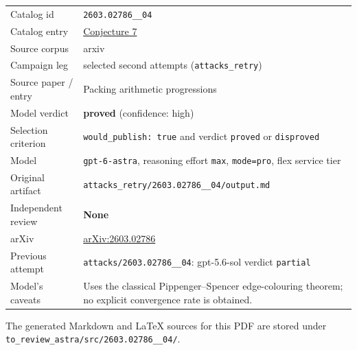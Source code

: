 \documentclass[
  11pt,
  a4paper,
]{article}
\newcounter{none} %
\begin{document}
{\def\LTcaptype{none} %
\begin{longtable}[]{@{}
  >{\raggedright\arraybackslash}p{}
  >{\raggedright\arraybackslash}p{}@{}}
\toprule\noalign{}
\endhead
\bottomrule\noalign{}
\endlastfoot
Catalog id & \texttt{2603.02786\_\_04} \\
Catalog entry &
\href{https://graph-theory-ai.github.io/graph-conjectures/arxiv/2603.02786__04/}{Conjecture
7} \\
Source corpus & arxiv \\
Campaign leg & selected second attempts (\texttt{attacks\_retry}) \\
Source paper / entry & Packing arithmetic progressions \\
Model verdict & \textbf{proved} (confidence: high) \\
Selection criterion & \texttt{would\_publish:\ true} and verdict
\texttt{proved} or \texttt{disproved} \\
Model & \texttt{gpt-6-astra}, reasoning effort \texttt{max},
\texttt{mode=pro}, flex service tier \\
Original artifact &
\texttt{attacks\_retry/2603.02786\_\_04/output.md} \\
Independent review & \textbf{None} \\
arXiv & \href{https://arxiv.org/abs/2603.02786}{arXiv:2603.02786} \\
Previous attempt & \texttt{attacks/2603.02786\_\_04}: gpt-5.6-sol
verdict \texttt{partial} \\
Model's caveats & Uses the classical Pippenger--Spencer edge-colouring
theorem; no explicit convergence rate is obtained. \\
\end{longtable}
}

The generated Markdown and LaTeX sources for this PDF are stored under
\texttt{to\_review\_astra/src/2603.02786\_\_04/}.
\end{document}
